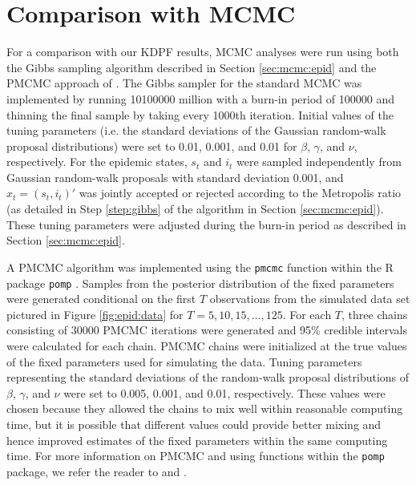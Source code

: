 \section{Comparison with MCMC} \label{sec:epid:pmcmc}

For a comparison with our KDPF results, MCMC analyses were run using both the Gibbs sampling algorithm described in Section \ref{sec:mcmc:epid} and the PMCMC approach of \citet{Andr:Douc:Hol:pmcmc:2010}. The Gibbs sampler for the standard MCMC was implemented by running 10100000 million with a burn-in period of 100000 and thinning the final sample by taking every 1000th iteration. Initial values of the tuning parameters (i.e. the standard deviations of the Gaussian random-walk proposal distributions) were set to 0.01, 0.001, and 0.01 for $\beta$, $\gamma$, and $\nu$, respectively. For the epidemic states, $s_t$ and $i_t$ were sampled independently from Gaussian random-walk proposals with standard deviation 0.001, and $x_t = (s_t,i_t)'$ was jointly accepted or rejected according to the Metropolis ratio (as detailed in Step \ref{step:gibbs} of the algorithm in Section \ref{sec:mcmc:epid}). These tuning parameters were adjusted during the burn-in period as described in Section \ref{sec:mcmc:epid}.

A PMCMC algorithm was implemented using the {\tt pmcmc} function within the R package {\tt pomp} \citep{pomp}. Samples from the posterior distribution of the fixed parameters were generated conditional on the first $T$ observations from the simulated data set pictured in Figure \ref{fig:epid:data} for $T = 5, 10, 15, \ldots, 125$. For each $T$, three chains consisting of 30000 PMCMC iterations were generated and 95\% credible intervals were calculated for each chain. PMCMC chains were initialized at the true values of the fixed parameters used for simulating the data. Tuning parameters representing the standard deviations of the random-walk proposal distributions of $\beta$, $\gamma$, and $\nu$ were set to 0.005, 0.001, and 0.01, respectively. These values were chosen because they allowed the chains to mix well within reasonable computing time, but it is possible that different values could provide better mixing and hence improved estimates of the fixed parameters within the same computing time. For more information on PMCMC and using functions within the {\tt pomp} package, we refer the reader to \citet{Andr:Douc:Hol:pmcmc:2010} and \citet{pomp}.

